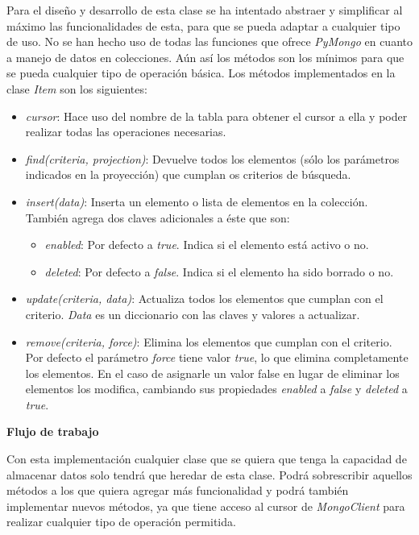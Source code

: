 \bigskip
Para el diseño y desarrollo de esta clase se ha intentado abstraer y simplificar al máximo las funcionalidades de esta, para que se pueda adaptar a cualquier tipo de uso. No se han hecho uso de todas las funciones que ofrece \textit{PyMongo} en cuanto a manejo de datos en colecciones. Aún así los métodos son los mínimos para que se pueda cualquier tipo de operación básica. Los métodos implementados en la clase \textit{Item} son los siguientes:
\begin{itemize}
	\item \textit{cursor}: Hace uso del nombre de la tabla para obtener el cursor a ella y poder realizar todas las operaciones necesarias.
	\item \textit{find(criteria, projection)}: Devuelve todos los elementos (sólo los parámetros indicados en la proyección) que cumplan os criterios de búsqueda.
	\item \textit{insert(data)}: Inserta un elemento o lista de elementos en la colección. También agrega dos claves adicionales a éste que son:
	\begin{itemize}
		\item \textit{enabled}: Por defecto a \textit{true}. Indica si el elemento está activo o no.
		\item \textit{deleted}: Por defecto a \textit{false}. Indica si el elemento ha sido borrado o no.
	\end{itemize}
	\item \textit{update(criteria, data)}: Actualiza todos los elementos que cumplan con el criterio. \textit{Data} es un diccionario con las claves y valores a actualizar.
	\item \textit{remove(criteria, force)}: Elimina los elementos que cumplan con el criterio. Por defecto el parámetro \textit{force} tiene valor \textit{true}, lo que elimina completamente los elementos. En el caso de asignarle un valor false en lugar de eliminar los elementos los modifica, cambiando sus propiedades \textit{enabled} a \textit{false} y \textit{deleted} a \textit{true}.
\end{itemize}


\bigskip
\textbf{Flujo de trabajo}

Con esta implementación cualquier clase que se quiera que tenga la capacidad de almacenar datos solo tendrá que heredar de esta clase. Podrá sobrescribir aquellos métodos a los que quiera agregar más funcionalidad y podrá también implementar nuevos métodos, ya que tiene acceso al cursor de \textit{MongoClient} para realizar cualquier tipo de operación permitida.

